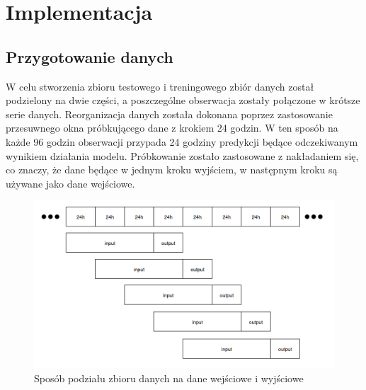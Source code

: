 \section{Implementacja}

\subsection{Przygotowanie danych}

W celu stworzenia zbioru testowego i treningowego zbiór danych został podzielony
na dwie części, a poszczególne obserwacja zostały połączone w krótsze serie danych.
Reorganizacja danych została dokonana poprzez zastosowanie przesuwnego okna próbkującego
dane z krokiem 24 godzin. W ten sposób na każde 96 godzin obserwacji przypada 24 godziny predykcji
będące odczekiwanym wynikiem działania modelu. Próbkowanie zostało zastosowane z nakładaniem się,
co znaczy, że dane będące w jednym kroku wyjściem, w następnym kroku są używane jako dane wejściowe.

\begin{figure}[H]
    \centering
    \includegraphics[width=\textwidth]{images/division.png}
    \caption{Sposób podziału zbioru danych na dane wejściowe i wyjściowe}
    \label{division}
\end{figure}



